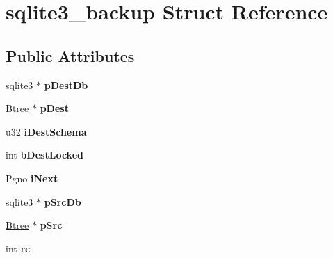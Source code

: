 \hypertarget{structsqlite3__backup}{\section{sqlite3\-\_\-backup Struct Reference}
\label{structsqlite3__backup}
}
\subsection*{Public Attributes}
\begin{DoxyCompactItemize}
\item 
\hypertarget{structsqlite3__backup_ad9b5074a860e01b31bbf9cb27f3808d9}{\hyperlink{structsqlite3}{sqlite3} $\ast$ {\bfseries p\-Dest\-Db}}\label{structsqlite3__backup_ad9b5074a860e01b31bbf9cb27f3808d9}

\item 
\hypertarget{structsqlite3__backup_a9e011336a89274f0ebfefdcede198f71}{\hyperlink{struct_btree}{Btree} $\ast$ {\bfseries p\-Dest}}\label{structsqlite3__backup_a9e011336a89274f0ebfefdcede198f71}

\item 
\hypertarget{structsqlite3__backup_a3f294f50b4ef206452dddd14f2a7cf6a}{u32 {\bfseries i\-Dest\-Schema}}\label{structsqlite3__backup_a3f294f50b4ef206452dddd14f2a7cf6a}

\item 
\hypertarget{structsqlite3__backup_aa0d385678bc5c3fd4da4201ff03a5856}{int {\bfseries b\-Dest\-Locked}}\label{structsqlite3__backup_aa0d385678bc5c3fd4da4201ff03a5856}

\item 
\hypertarget{structsqlite3__backup_a92454bf354f928aade2b2f92e6cfd088}{Pgno {\bfseries i\-Next}}\label{structsqlite3__backup_a92454bf354f928aade2b2f92e6cfd088}

\item 
\hypertarget{structsqlite3__backup_a0bcc0528bb3f5ec52eb40c3e7a4f7adc}{\hyperlink{structsqlite3}{sqlite3} $\ast$ {\bfseries p\-Src\-Db}}\label{structsqlite3__backup_a0bcc0528bb3f5ec52eb40c3e7a4f7adc}

\item 
\hypertarget{structsqlite3__backup_aa48f873d1de446638ff71fdae606e672}{\hyperlink{struct_btree}{Btree} $\ast$ {\bfseries p\-Src}}\label{structsqlite3__backup_aa48f873d1de446638ff71fdae606e672}

\item 
\hypertarget{structsqlite3__backup_aab860dbed6181702b4c6b80d43cde411}{int {\bfseries rc}}\label{structsqlite3__backup_aab860dbed6181702b4c6b80d43cde411}


\end{DoxyCompactItemize}
